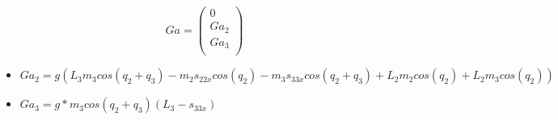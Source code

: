	\[
	Ga=
	\begin{pmatrix}
	0\\
	Ga_{2}\\
	Ga_{3}\\
	\end{pmatrix} \] 
	
	\begin{itemize}
		\item 
		$Ga_{2}=g(L_{3}m_{3}cos(q_{2}+q_{3})-m_{2}s_{22x}cos(q_{2})-m_{3}s_{33x}cos(q_{2}+q_{3})+L_{2}m_{2}cos(q_{2})+L_{2}m_{3}cos(q_{2}))
		$
		
		\item 
		$Ga_{3}=g*m_{3}cos(q_{2}+q_{3})(L_{3}-s_{33x})
		$
	\end{itemize}
